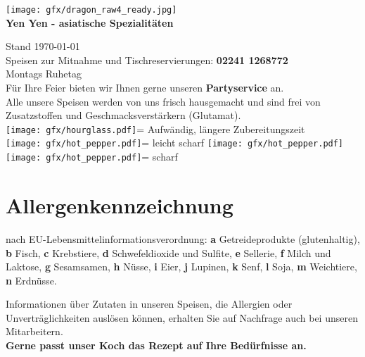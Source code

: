 \documentclass[12pt,a5paper,oneside]{scrreprt}
\newcommand{\slow}{\texttt{[image: gfx/hourglass.pdf]}\xspace}
\newcommand{\hotpepper}{\texttt{[image: gfx/hot\_pepper.pdf]}\xspace}
\begin{document}
 
\RaggedRight
{}

\begin{center}
\texttt{[image: gfx/dragon\_raw4\_ready.jpg]}\\[2mm]%
\textbf{Yen Yen - asiatische Spezialitäten}%
\end{center}%

\begin{center}
	{\small Stand \today}\\[2mm]
	Speisen zur Mitnahme und Tischreservierungen: \textbf{02241 1268772}\\[1mm]
	Montags Ruhetag\\[1mm]
	Für Ihre Feier bieten wir Ihnen gerne unseren \textbf{Partyservice} an.\\[2mm]
	Alle unsere Speisen werden von uns frisch hausgemacht und sind frei von Zusatzstoffen und Geschmacksverstärkern (Glutamat).\\[2mm]

	\slow = Aufwändig, längere Zubereitungszeit\\
	\hotpepper = leicht scharf \quad \quad \hotpepper\hotpepper = scharf
\end{center}%

\newpage


\newpage
\section*{Allergenkennzeichnung}
nach EU-Lebensmittelinformationsverordnung: 
\textbf{a} Getreideprodukte (glutenhaltig), 
\textbf{b} Fisch,
\textbf{c} Krebstiere,
\textbf{d} Schwefeldioxide und Sulfite,
\textbf{e} Sellerie,
\textbf{f} Milch und Laktose,
\textbf{g} Sesamsamen,
\textbf{h} Nüsse,
\textbf{i} Eier,
\textbf{j} Lupinen,
\textbf{k} Senf,
\textbf{l} Soja,
\textbf{m} Weichtiere,
\textbf{n} Erdnüsse. 

Informationen über Zutaten in unseren Speisen, die Allergien
oder Unverträglichkeiten auslösen können, erhalten Sie auf Nachfrage
auch bei unseren Mitarbeitern.\\ 
\textbf{Gerne passt unser Koch das Rezept auf Ihre Bedürfnisse an.} %
\newpage
~
\end{document}
